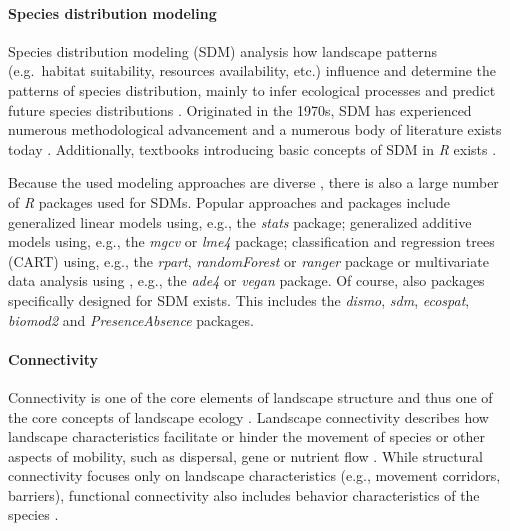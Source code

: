 \documentclass[smallextended]{svjour3}       %
\begin{document}
\hypertarget{sec:SDM}{%
\paragraph{Species distribution modeling}\label{sec:SDM}}

Species distribution modeling (SDM) analysis how landscape patterns (e.g.~habitat suitability, resources availability, etc.) influence and determine the patterns of species distribution, mainly to infer ecological processes and predict future species distributions \cite{Wiersma2011}.
Originated in the 1970s, SDM has experienced numerous methodological advancement and a numerous body of literature exists today \cite{Zimmermann2010}. Additionally, textbooks introducing basic concepts of SDM in \emph{R} exists \cite{Guisan2017,Fletcher2019}.

Because the used modeling approaches are diverse \cite{Hooten2011,Kerr2011,Fletcher2019}, there is also a large number of \emph{R} packages used for SDMs.
Popular approaches and packages include generalized linear models using, e.g., the \emph{stats} package; generalized additive models using, e.g., the \emph{mgcv} or \emph{lme4} package; classification and regression trees (CART) using, e.g., the \emph{rpart}, \emph{randomForest} or \emph{ranger} package or multivariate data analysis using , e.g., the \emph{ade4} or \emph{vegan} package.
Of course, also packages specifically designed for SDM exists.
This includes the \emph{dismo}, \emph{sdm}, \emph{ecospat}, \emph{biomod2} and \emph{PresenceAbsence} packages.

\hypertarget{sec:connectivity}{%
\paragraph{Connectivity}\label{sec:connectivity}}

Connectivity is one of the core elements of landscape structure \cite{Taylor1993} and thus one of the core concepts of landscape ecology \cite{With2019}.
Landscape connectivity describes how landscape characteristics facilitate or hinder the movement of species \cite{Tischendorf2000} or other aspects of mobility, such as dispersal, gene or nutrient flow \cite{With2019}.
While structural connectivity focuses only on landscape characteristics (e.g., movement corridors, barriers), functional connectivity also includes behavior characteristics of the species \cite{Tischendorf2000,With2019}.
\end{document}
